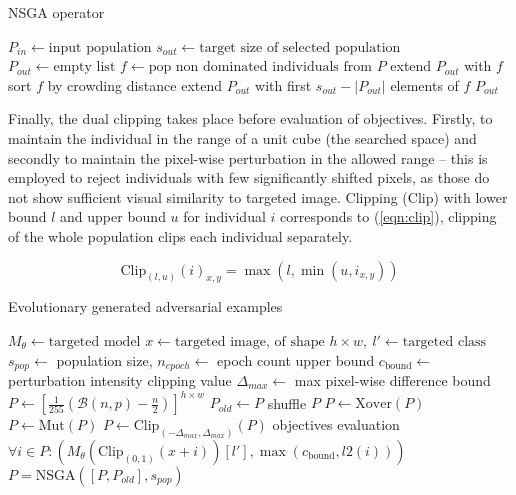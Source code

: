 \begin{algorithm}
\caption{NSGA operator}
\label{algo:nsga_cd}
\begin{algorithmic}
\STATE $P_{in} \gets \text{input population}$
\STATE $s_{out} \gets \text{target size of selected population}$
\STATE
\STATE $P_{out} \gets \text{empty list}$
\STATE $f \gets \text{pop non dominated individuals from } P$
\STATE extend $P_{out}$ with $f$
\ELSE
\STATE sort $f$ by crowding distance
\STATE extend $P_{out}$ with first $s_{out} - |P_{out}|$ elements of $f$
\ENDIF
\ENDWHILE
\RETURN $P_{out}$
\end{algorithmic}
\end{algorithm}

Finally, the dual clipping takes place before evaluation of objectives. Firstly, to maintain the individual in the range of a unit cube (the searched space) and secondly to maintain the pixel-wise perturbation in the allowed range -- this is employed to reject individuals with few significantly shifted pixels, as those do not show sufficient visual similarity to targeted image. Clipping (Clip) with lower bound $l$ and upper bound $u$ for individual $i$ corresponds to (\ref{eqn:clip}), clipping of the whole population clips each individual separately.

\begin{equation} \label{eqn:clip}
\text{Clip}_{(l,u)}(i)_{x, y} = \max\left(l, \min(u, i_{x, y})\right)
\end{equation}

\begin{algorithm}
\caption{Evolutionary generated adversarial examples}
\label{algo:evgena}
\begin{algorithmic}
\STATE $M_\theta \gets \text{targeted model}$
\STATE $x \gets \text{targeted image, of shape } h \times w,\ l' \gets \text{targeted class}$
\STATE $s_{pop} \gets$ population size, $n_{epoch} \gets$ epoch count upper bound
\STATE $c_\text{bound} \gets$ perturbation intensity clipping value
\STATE $\Delta_{max} \gets$ max pixel-wise difference bound
\STATE
\STATE $P \gets \left[\frac{1}{255}\left(\mathcal{B}(n, p) - \frac{n}{2}\right)\right]^{h \times w}$
\STATE $P_{old} \gets P$
\STATE shuffle $P$
\STATE $P \gets \text{Xover}(P)$
\STATE $P \gets \text{Mut}(P)$
\STATE $P \gets \text{Clip}_{(-\Delta_{max},\Delta_{max})}(P)$
\STATE objectives evaluation $\forall i \in P: \left(
    M_\theta \left(\text{Clip}_{(0,1)}\left(x + i\right) \right)[l'],
    \max \left(c_\text{bound}, l2\left(i\right) \right)
\right)$
\STATE $P = \text{NSGA}\left([P, P_{old}], s_{pop}\right)$
\ENDWHILE
\end{algorithmic}
\end{algorithm}

